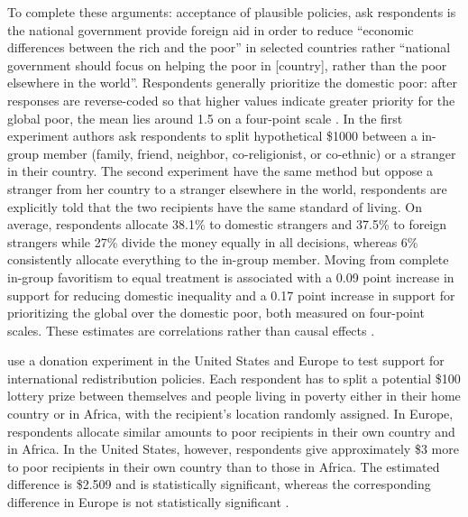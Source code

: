 To complete these arguments: acceptance of plausible policies, \citet{cappelen_universalism_2025} ask respondents is the national government provide foreign aid in order to reduce ``economic differences between the rich and the poor'' in selected countries rather ``national government should focus on helping the poor in [country], rather than the poor elsewhere in the world''. Respondents generally prioritize the domestic poor: after responses are reverse-coded so that higher values indicate greater priority for the global poor, the mean lies around 1.5 on a four-point scale \citep[Figure 7B]{cappelen_universalism_2025}.
In the first experiment authors ask respondents to split hypothetical \$1000 between a in-group member (family, friend, neighbor, co-religionist, or co-ethnic) or a stranger in their country. The second experiment have the same method but oppose a stranger from her country to a stranger elsewhere in the world, respondents are explicitly told that the two recipients have the same standard of living. On average, respondents allocate 38.1\% to domestic strangers and 37.5\% to foreign strangers while 27\% divide the money equally in all decisions, whereas 6\% consistently allocate everything to the in-group member. Moving from complete in-group favoritism to equal treatment is associated with a 0.09 point increase in support for reducing domestic inequality and a 0.17 point increase in support for prioritizing the global over the domestic poor, both measured on four-point scales. These estimates are correlations rather than causal effects \cite[Table 1]{cappelen_universalism_2025}.


\citet{fabre_majority_2025} use a donation experiment in the United States and Europe to test support for international redistribution policies. Each respondent has to split a potential \$100 lottery prize between themselves and people living in poverty either in their home country or in Africa, with the recipient's location randomly assigned. In Europe, respondents allocate similar amounts to poor recipients in their own country and in Africa. In the United States, however, respondents give approximately \$3 more to poor recipients in their own country than to those in Africa. The estimated difference is \$2.509 and is statistically significant, whereas the corresponding difference in Europe is not statistically significant \citep[Figure S13 \& Table ED2]{fabre_majority_2025_si}.

